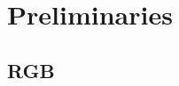 \begin{comment}

\end{comment}

\chapter{Preliminaries}
\label{cha:preliminaries}

\section{RGB}
\label{sec:rgb}

\printbibliography[heading=subbibliography]
